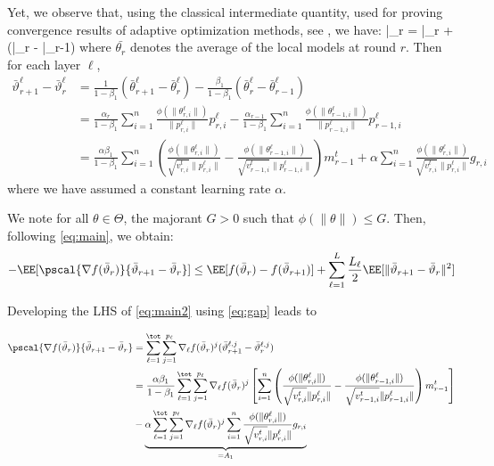 \documentclass{article}
\begin{document}
Yet, we observe that, using the classical intermediate quantity, used for proving convergence results of adaptive optimization methods, see \citep{}, we have:
\beq\label{eq:defseq}
\bar{\vartheta}_r = \bar{\theta}_r +  (\bar{\theta}_{r} - \bar{\theta}_{r-1})
\eeq
where $\bar{\theta_r}$ denotes the average of the local models at round $r$.
Then for each layer $\ell$,
\begin{align}\label{eq:gap}
\bar{\vartheta}^\ell_{r+1} - \bar{\vartheta}^\ell_r  & = \frac{1}{1-\beta_1}(\bar{\theta}^\ell_{r+1} - \bar{\theta}^\ell_{r}) - \frac{\beta_1}{1-\beta_1}(\bar{\theta}^\ell_{r} - \bar{\theta}^\ell_{r-1})\\
& = \frac{\alpha_{r}}{1-\beta_1} \sum_{i = 1}^n \frac{\phi(\|\theta_{r,i}^{\ell}\|)}{\|p_{r,i}^{\ell}\|} p_{r,i}^{\ell}  - \frac{\alpha_{r-1}}{1-\beta_1}\sum_{i = 1}^n \frac{\phi(\|\theta_{r-1,i}^{\ell}\|)}{\|p_{r-1,i}^{\ell}\|} p_{r-1,i}^{\ell}\\
& = \frac{\alpha \beta_1}{1-\beta_1}  \sum_{i = 1}^n  \left( \frac{\phi(\|\theta_{r,i}^{\ell}\|)}{\sqrt{v^{t}_{r,i}} \|p_{r,i}^{\ell}\|} - \frac{\phi(\|\theta_{r-1,i}^{\ell}\|)}{\sqrt{v^{t}_{r-1,i}} \|p_{r-1,i}^{\ell}\|} \right) m^{t}_{r-1} + \alpha \sum_{i = 1}^n \frac{\phi(\|\theta_{r,i}^{\ell}\|)}{\sqrt{v^{t}_{r,i}} \|p_{r,i}^{\ell}\|} g_{r,i}
\end{align}
where we have assumed a constant learning rate $\alpha$.


We note for all $\theta \in \Theta$, the majorant $G > 0$ such that $\phi(\|\theta \|) \leq G$. Then, following \eqref{eq:main}, we obtain:
\begin{align}\label{eq:main2}
- \EE[  \pscal{\nabla f(\bar{\vartheta}_r)}{\bar{\vartheta}_{r+1} - \bar{\vartheta}_r}]  \leq  \EE[ f(\bar{\vartheta}_r) - f(\bar{\vartheta}_{r+1})] + \sum_{\ell =1}^L \frac{L_\ell}{2} \EE[  \| \bar{\vartheta}_{r+1} - \bar{\vartheta}_r \|^2]
\end{align}

Developing the LHS of \eqref{eq:main2} using \eqref{eq:gap} leads to

\begin{align}
\pscal{\nabla f(\bar{\vartheta}_r)}{\bar{\vartheta}_{r+1} - \bar{\vartheta}_r} &= \sum_{\ell=1}^\tot \sum_{j=1}^{p_\ell} \nabla_{\ell} f(\bar{\vartheta}_r)^j (\bar{\vartheta}^{\ell,j}_{r+1} - \bar{\vartheta}^{\ell,j}_r) \\
& =  \frac{\alpha \beta_1}{1-\beta_1}  \sum_{\ell=1}^\tot \sum_{j=1}^{p_\ell} \nabla_{\ell} f(\bar{\vartheta}_r)^j \left[   \sum_{i = 1}^n  \left( \frac{\phi(\|\theta_{r,i}^{\ell}\|)}{\sqrt{v^{t}_{r,i}} \|p_{r,i}^{\ell}\|} - \frac{\phi(\|\theta_{r-1,i}^{\ell}\|)}{\sqrt{v^{t}_{r-1,i}} \|p_{r-1,i}^{\ell}\|} \right) m^{t}_{r-1}  \right] \\
& - \underbrace{ \alpha \sum_{\ell=1}^\tot \sum_{j=1}^{p_\ell} \nabla_{\ell} f(\bar{\vartheta}_r)^j  \sum_{i = 1}^n \frac{\phi(\|\theta_{r,i}^{\ell}\|)}{\sqrt{v^{t}_{r,i}} \|p_{r,i}^{\ell}\|} g_{r,i}}_{= A_1}
\end{align}
\end{document}
